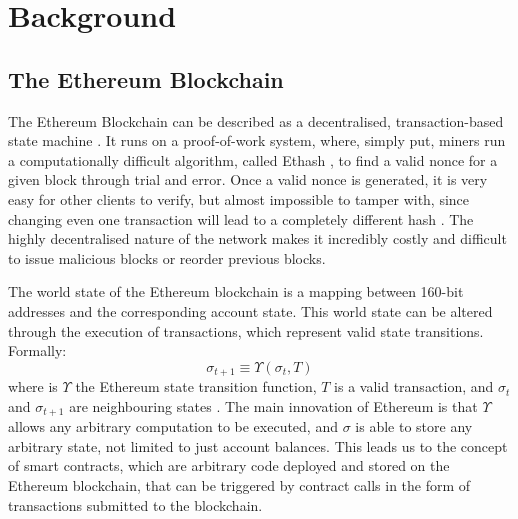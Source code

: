 \chapter{Background}

\section{The Ethereum Blockchain}

The Ethereum Blockchain can be described as a decentralised, transaction-based 
state machine \cite{ethereumyellowpaper}. It runs on a proof-of-work system,
where, simply put, miners run a computationally difficult algorithm, called Ethash
\cite{ethash}, to find a valid nonce for a given block through trial and error. 
Once a valid nonce is generated, it is very easy for other clients to verify, but almost impossible to tamper with,
since changing even one transaction will lead to a completely different hash \cite{ethereumpow}.
The highly decentralised nature of the network makes it incredibly costly and difficult to
issue malicious blocks or reorder previous blocks.


The world state of the Ethereum blockchain is a mapping between 160-bit addresses 
and the corresponding account state. This world state can be altered through the 
execution of transactions, which represent valid state transitions. Formally:
\[ \sigma_{t + 1} \equiv \Upsilon(\sigma_{t}, T) \]
where is $\Upsilon$ the Ethereum state transition function, $T$ is a valid transaction,
and $\sigma_{t}$ and $\sigma_{t + 1}$ are neighbouring states \cite{ethereumyellowpaper}.
The main innovation of Ethereum is that $\Upsilon$ allows any arbitrary computation to
be executed, and $\sigma$ is able to store any arbitrary state, not limited to just account 
balances. This leads us to the concept of smart contracts, which are arbitrary code deployed
and stored on the Ethereum blockchain, that can be triggered by contract calls in the form
of transactions submitted to the blockchain.

